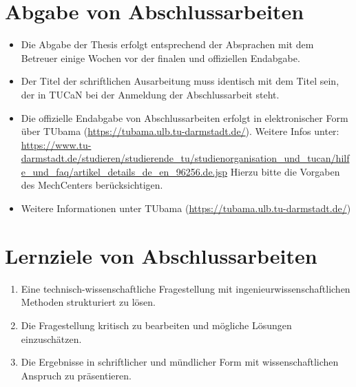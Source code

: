 \section{Abgabe von Abschlussarbeiten}

\begin{sloppypar}
\begin{itemize}
    \item Die Abgabe der Thesis erfolgt entsprechend der Absprachen mit dem Betreuer einige Wochen vor der finalen und offiziellen Endabgabe.  
    
    \item Der Titel der schriftlichen Ausarbeitung muss identisch mit dem Titel sein, der in TUCaN bei der Anmeldung der Abschlussarbeit steht. 
    
    \item Die offizielle Endabgabe von Abschlussarbeiten erfolgt in elektronischer Form über TUbama (\url{https://tubama.ulb.tu-darmstadt.de/}). Weitere Infos unter: \url{https://www.tu-darmstadt.de/studieren/studierende_tu/studienorganisation_und_tucan/hilfe_und_faq/artikel_details_de_en_96256.de.jsp}
    Hierzu bitte die Vorgaben des MechCenters berücksichtigen.

    \item Weitere Informationen unter TUbama (\url{https://tubama.ulb.tu-darmstadt.de/})

\end{itemize}
\end{sloppypar}


\section{Lernziele von Abschlussarbeiten}

\begin{enumerate}
    \item Eine technisch-wissenschaftliche Fragestellung mit ingenieurwissenschaftlichen Methoden strukturiert zu lösen.
    \item Die Fragestellung kritisch zu bearbeiten und mögliche Lösungen einzuschätzen.
    \item Die Ergebnisse in schriftlicher und mündlicher Form mit wissenschaftlichen Anspruch zu präsentieren.
\end{enumerate}

